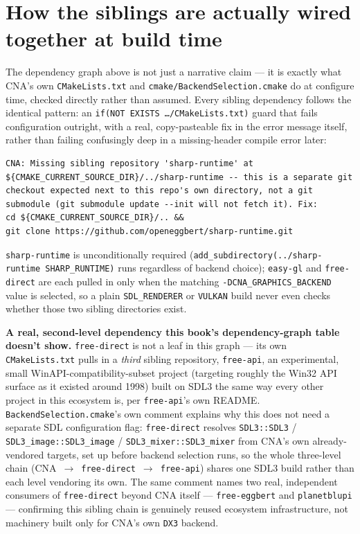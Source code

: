 \section{How the siblings are actually wired together at build time}
\label{sec:sibling-wiring}

The dependency graph above is not just a narrative claim --- it is exactly what CNA's own
\texttt{CMakeLists.txt} and \texttt{cmake/BackendSelection.cmake} do at configure time, checked
directly rather than assumed. Every sibling dependency follows the identical pattern: an
\texttt{if(NOT EXISTS \ldots/CMakeLists.txt)} guard that fails configuration outright, with a
real, copy-pasteable fix in the error message itself, rather than failing confusingly deep in a
missing-header compile error later:

\begin{lstlisting}[style=cnashell]
CNA: Missing sibling repository 'sharp-runtime' at
${CMAKE_CURRENT_SOURCE_DIR}/../sharp-runtime -- this is a separate git
checkout expected next to this repo's own directory, not a git
submodule (git submodule update --init will not fetch it). Fix:
cd ${CMAKE_CURRENT_SOURCE_DIR}/.. &&
git clone https://github.com/openeggbert/sharp-runtime.git
\end{lstlisting}

\texttt{sharp-runtime} is unconditionally required (\texttt{add\_subdirectory(../sharp-runtime
SHARP\_RUNTIME)} runs regardless of backend choice); \texttt{easy-gl} and \texttt{free-direct}
are each pulled in only when the matching \texttt{-DCNA\_GRAPHICS\_BACKEND} value is selected,
so a plain \texttt{SDL\_RENDERER} or \texttt{VULKAN} build never even checks whether those two
sibling directories exist.

\begin{sourcenote}
\textbf{A real, second-level dependency this book's dependency-graph table doesn't show.}
\texttt{free-direct} is not a leaf in this graph --- its own \texttt{CMakeLists.txt} pulls in a
\emph{third} sibling repository, \texttt{free-api}, an experimental, small
WinAPI-compatibility-subset project (targeting roughly the Win32 API surface as it existed
around 1998) built on SDL3 the same way every other project in this ecosystem is, per
\texttt{free-api}'s own README. \texttt{BackendSelection.cmake}'s own comment explains why this
does not need a separate SDL configuration flag: \texttt{free-direct} resolves
\texttt{SDL3::SDL3} / \texttt{SDL3\_image::SDL3\_image} / \texttt{SDL3\_mixer::SDL3\_mixer} from
CNA's own already-vendored targets, set up before backend selection runs, so the whole
three-level chain (CNA~$\to$~\texttt{free-direct}~$\to$~\texttt{free-api}) shares one SDL3
build rather than each level vendoring its own. The same comment names two real, independent
consumers of \texttt{free-direct} beyond CNA itself --- \texttt{free-eggbert} and
\texttt{planetblupi} --- confirming this sibling chain is genuinely reused ecosystem
infrastructure, not machinery built only for CNA's own \texttt{DX3} backend.
\end{sourcenote}


